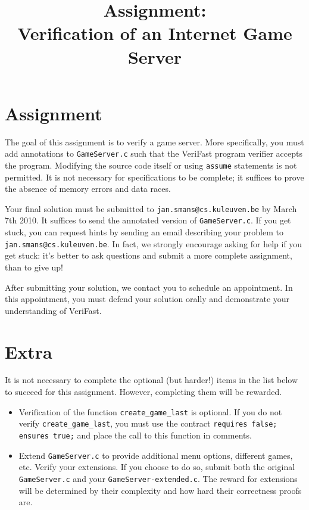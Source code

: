 \documentclass{article}
\title{Assignment:\\
Verification of an Internet Game Server}
\begin{document}
\maketitle

\section{Assignment}
The goal of this assignment is to verify a game server. More specifically, you must add annotations to \texttt{GameServer.c} such that the VeriFast program verifier accepts the program. Modifying the source code itself or using \texttt{assume} statements is not permitted. It is not necessary for specifications to be complete; it suffices to prove the absence of memory errors and data races.

Your final solution must be submitted to \texttt{jan.smans@cs.kuleuven.be} by March 7th 2010. It suffices to send the annotated version of \texttt{GameServer.c}. If you get stuck, you can request hints by sending an email describing your problem to \texttt{jan.smans@cs.kuleuven.be}. In fact, we strongly encourage asking for help if you get stuck: it's better to ask questions and submit a more complete assignment, than to give up!

After submitting your solution, we contact you to schedule an appointment. In this appointment, you must defend your solution orally and demonstrate your understanding of VeriFast.

\section{Extra}
It is not necessary to complete the optional (but harder!) items in the list below to succeed for this assignment. However, completing them will be rewarded.

\begin{itemize}
  \item Verification of the function \texttt{create\_game\_last} is optional. If you do not verify \texttt{create\_game\_last}, you must use the contract \texttt{requires false; ensures true;} and place the call to this function in comments.
  \item Extend \texttt{GameServer.c} to provide additional menu options, different games, etc. Verify your extensions. If you choose to do so, submit both the original \texttt{GameServer.c} and your \texttt{GameServer-extended.c}. The reward for extensions will be determined by their complexity and how hard their correctness proofs are.
\end{itemize}
\end{document}
